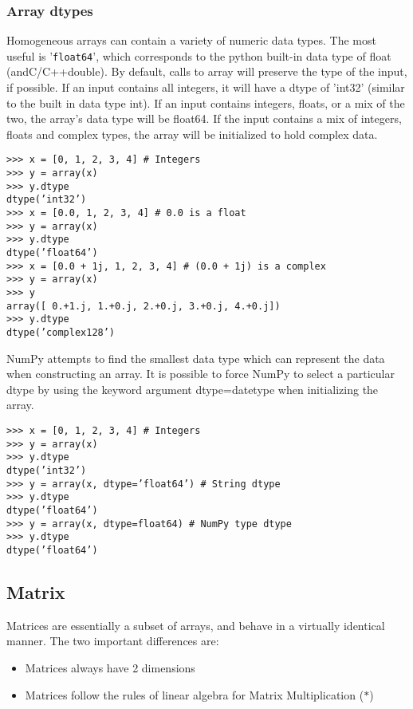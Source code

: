\documentclass[Pydata.tex]{subfiles}
\begin{document}
\subsubsection*{Array dtypes}
Homogeneous arrays can contain a variety of numeric data types. The most useful is ’\texttt{float64}’, which corresponds
to the python built-in data type of float (andC/C++double). By default, calls to array will preserve
the type of the input, if possible. If an input contains all integers, it will have a dtype of ’int32’ (similar to
the built in data type int). If an input contains integers, floats, or a mix of the two, the array’s data type will
be float64. If the input contains a mix of integers, floats and complex types, the array will be initialized
to hold complex data.
\begin{framed}
\begin{verbatim}
>>> x = [0, 1, 2, 3, 4] # Integers
>>> y = array(x)
>>> y.dtype
dtype(’int32’)
>>> x = [0.0, 1, 2, 3, 4] # 0.0 is a float
>>> y = array(x)
>>> y.dtype
dtype(’float64’)
>>> x = [0.0 + 1j, 1, 2, 3, 4] # (0.0 + 1j) is a complex
>>> y = array(x)
>>> y
array([ 0.+1.j, 1.+0.j, 2.+0.j, 3.+0.j, 4.+0.j])
>>> y.dtype
dtype(’complex128’)
\end{verbatim}
\end{framed}
NumPy attempts to find the smallest data type which can represent the data when constructing an array.
It is possible to force NumPy to select a particular dtype by using the keyword argument dtype=datetype
when initializing the array.
\begin{framed}
\begin{verbatim}
>>> x = [0, 1, 2, 3, 4] # Integers
>>> y = array(x)
>>> y.dtype
dtype(’int32’)
>>> y = array(x, dtype=’float64’) # String dtype
>>> y.dtype
dtype(’float64’)
>>> y = array(x, dtype=float64) # NumPy type dtype
>>> y.dtype
dtype(’float64’)
\end{verbatim}
\end{framed}
\newpage
\subsection{Matrix}
Matrices are essentially a subset of arrays, and behave in a virtually identical manner. The two important
differences are:

\begin{itemize}
\item Matrices always have 2 dimensions
\item Matrices follow the rules of linear algebra for Matrix Multiplication ($\ast$)
\end{itemize}
\end{document}
